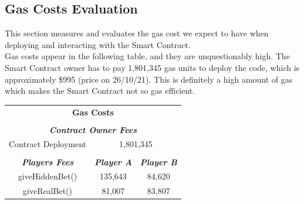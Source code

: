 \documentclass[12pt,a4paper]{article}
\begin{document}
\subsection*{Gas Costs Evaluation}
This section measures and evaluates the gas cost we expect to have when deploying and
interacting with the Smart Contract. \\

Gas costs appear in the following table, and they are unquestionably high.
The Smart Contract owner has to pay 1,801,345 gas units to deploy the code, which is
approximately \$995 (price on 26/10/21). This is definitely a high amount of gas which makes the
Smart Contract not so gas efficient. \\

\begin{table}[htpb]
    \begin{center}
        \begin{tabular}{ccc}
        \multicolumn{3}{c}{\textbf{Gas Costs}}                                                                                                                   \\
        \multicolumn{1}{l}{}                                 & \multicolumn{1}{l}{}                            & \multicolumn{1}{l}{}                            \\ \hline
        \multicolumn{3}{|c|}{\textit{\textbf{Contract Owner Fees}}}                                                                                              \\ \hline
        \multicolumn{1}{|c|}{Contract Deployment}            & \multicolumn{2}{c|}{1,801,345}                                                                    \\ \hline
        \multicolumn{1}{l}{}                                 & \multicolumn{1}{l}{}                            & \multicolumn{1}{l}{}                            \\ \hline
        \multicolumn{1}{|c|}{\textit{\textbf{Players Fees}}} & \multicolumn{1}{c|}{\textit{\textbf{Player A}}} & \multicolumn{1}{c|}{\textit{\textbf{Player B}}} \\ \hline
        \multicolumn{1}{|c|}{giveHiddenBet()}                & \multicolumn{1}{c|}{135,643}                    & \multicolumn{1}{c|}{84,620}                     \\ \hline
        \multicolumn{1}{|c|}{giveRealBet()}                  & \multicolumn{1}{c|}{81,007}                     & \multicolumn{1}{c|}{83,807}                     \\ \hline

\end{tabular}
\end{center}
\end{table}
\end{document}
